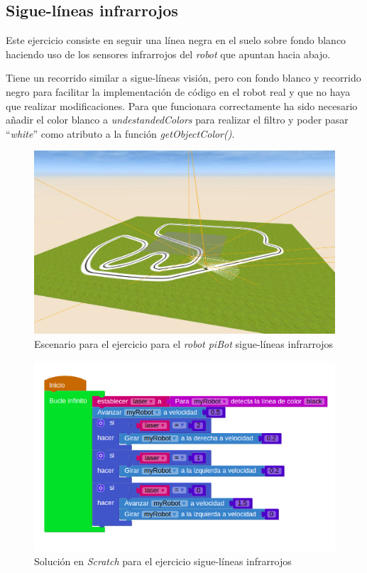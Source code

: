 \subsection{Sigue-líneas infrarrojos}
     Este ejercicio consiste en seguir una línea negra en el suelo sobre fondo blanco haciendo uso de los sensores infrarrojos del \textit{robot} que apuntan hacia abajo. 
     
    Tiene un recorrido similar a sigue-líneas visión, pero con fondo blanco y recorrido negro para facilitar la implementación de código en el robot real y que no haya que realizar modificaciones. Para que funcionara correctamente ha sido necesario añadir el color blanco a \textit{undestandedColors} para realizar el filtro y poder pasar ``\textit{white}'' como atributo a la función \textit{getObjectColor()}.
    
    \begin{figure}[H]
    \centering
    \includegraphics[scale=0.3]{img/siguelineas_ir.JPG}
    \caption{Escenario para el ejercicio para el \textit{robot piBot} sigue-líneas infrarrojos} \label{fig:siguelineasIR}
    \end{figure}
    
           \begin{figure}[H]
    \centering
    \includegraphics[scale=0.6]{img/siguelineaIRcodigo.png}
    \caption{Solución en \textit{Scratch} para el ejercicio sigue-líneas infrarrojos} 
    \label{fig:irSolution}
    \end{figure}
    
